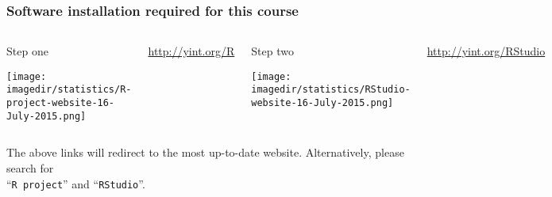 {
\begin{frame}\frametitle{}
\end{frame}}

{
\begin{frame}\frametitle{}
\end{frame}}


\begin{frame}\frametitle{Software installation required for this course}
	\begin{columns}[b]
			
			\begin{exampleblock}{\color{red}Step one}
				
				\vspace{10pt}
				\centerline{\texttt{[image: \\imagedir/statistics/R-project-website-16-July-2015.png]}}
			\end{exampleblock}
			
			\vfill
			
			\href{http://yint.org/R}{http://yint.org/R}
		
		
			\begin{exampleblock}{\color{red}Step two}
				\centerline{\texttt{[image: \\imagedir/statistics/RStudio-website-16-July-2015.png]}}
			\end{exampleblock}
			
			\vfill
			\href{http://yint.org/RStudio}{http://yint.org/RStudio}
	\end{columns}
	
	\vspace{6pt}
	\small
	The above links will redirect to the most up-to-date website. Alternatively, please search for\\ ``\texttt{R project}'' and ``\texttt{RStudio}''.
		
\end{frame}

